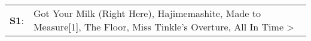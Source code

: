 \begin{supertabular}{p{0.03\textwidth}p{0.92\textwidth}}
 \textbf{S1}:  &  Got Your Milk (Right Here)\textsuperscript{}, \enspace Hajimemashite\textsuperscript{}, \enspace Made to Measure[1]\textsuperscript{}, \enspace The Floor\textsuperscript{}, \enspace Miss Tinkle's Overture\textsuperscript{}, \enspace All In Time\textsuperscript{} \textgreater {}\textsuperscript{}  \enspace  \\
\end{supertabular}
